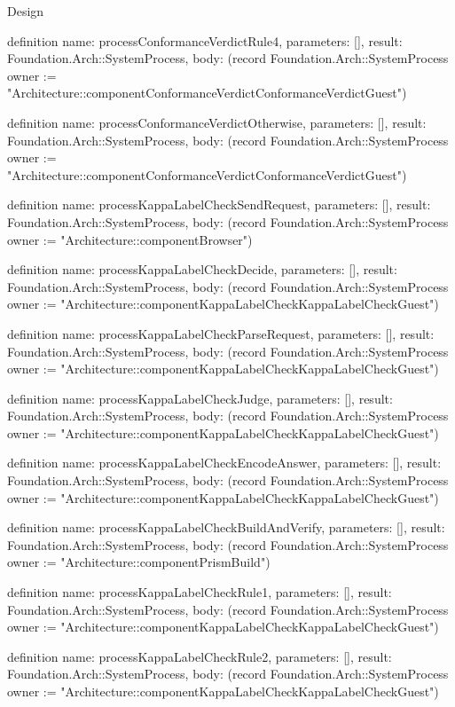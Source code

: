 \begin{lexlean}{Design}
\begin{semanticmodule}
definition{
  name: processConformanceVerdictRule4,
  parameters: [],
  result: Foundation.Arch::SystemProcess,
  body: (record Foundation.Arch::SystemProcess {owner := "Architecture::componentConformanceVerdictConformanceVerdictGuest"})
}

definition{
  name: processConformanceVerdictOtherwise,
  parameters: [],
  result: Foundation.Arch::SystemProcess,
  body: (record Foundation.Arch::SystemProcess {owner := "Architecture::componentConformanceVerdictConformanceVerdictGuest"})
}

definition{
  name: processKappaLabelCheckSendRequest,
  parameters: [],
  result: Foundation.Arch::SystemProcess,
  body: (record Foundation.Arch::SystemProcess {owner := "Architecture::componentBrowser"})
}

definition{
  name: processKappaLabelCheckDecide,
  parameters: [],
  result: Foundation.Arch::SystemProcess,
  body: (record Foundation.Arch::SystemProcess {owner := "Architecture::componentKappaLabelCheckKappaLabelCheckGuest"})
}

definition{
  name: processKappaLabelCheckParseRequest,
  parameters: [],
  result: Foundation.Arch::SystemProcess,
  body: (record Foundation.Arch::SystemProcess {owner := "Architecture::componentKappaLabelCheckKappaLabelCheckGuest"})
}

definition{
  name: processKappaLabelCheckJudge,
  parameters: [],
  result: Foundation.Arch::SystemProcess,
  body: (record Foundation.Arch::SystemProcess {owner := "Architecture::componentKappaLabelCheckKappaLabelCheckGuest"})
}

definition{
  name: processKappaLabelCheckEncodeAnswer,
  parameters: [],
  result: Foundation.Arch::SystemProcess,
  body: (record Foundation.Arch::SystemProcess {owner := "Architecture::componentKappaLabelCheckKappaLabelCheckGuest"})
}

definition{
  name: processKappaLabelCheckBuildAndVerify,
  parameters: [],
  result: Foundation.Arch::SystemProcess,
  body: (record Foundation.Arch::SystemProcess {owner := "Architecture::componentPrismBuild"})
}

definition{
  name: processKappaLabelCheckRule1,
  parameters: [],
  result: Foundation.Arch::SystemProcess,
  body: (record Foundation.Arch::SystemProcess {owner := "Architecture::componentKappaLabelCheckKappaLabelCheckGuest"})
}

definition{
  name: processKappaLabelCheckRule2,
  parameters: [],
  result: Foundation.Arch::SystemProcess,
  body: (record Foundation.Arch::SystemProcess {owner := "Architecture::componentKappaLabelCheckKappaLabelCheckGuest"})
}


\end{semanticmodule}
\end{lexlean}
